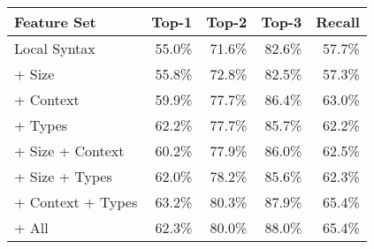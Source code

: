 \begin{table}[ht]
  \begin{minipage}{0.49\linewidth}
  \centering
  \linear
  \begin{tabular}{lrrrr}
    \toprule
    Feature Set                 & Top-1  & Top-2  & Top-3  & Recall \\
    \midrule
    Local Syntax                & 55.0\% & 71.6\% & 82.6\% & 57.7\% \\
    \midrule
    + Size                      & 55.8\% & 72.8\% & 82.5\% & 57.3\% \\
    + Context                   & 59.9\% & 77.7\% & 86.4\% & 63.0\% \\
    + Types                     & 62.2\% & 77.7\% & 85.7\% & 62.2\% \\
    \midrule
    + Size + Context            & 60.2\% & 77.9\% & 86.0\% & 62.5\% \\
    + Size + Types              & 62.0\% & 78.2\% & 85.6\% & 62.3\% \\
    + Context + Types           & 63.2\% & 80.3\% & 87.9\% & 65.4\% \\
    \midrule
    + All                       & 62.3\% & 80.0\% & 88.0\% & 65.4\% \\
    \bottomrule
  \end{tabular}
  \end{minipage}

\end{table}
